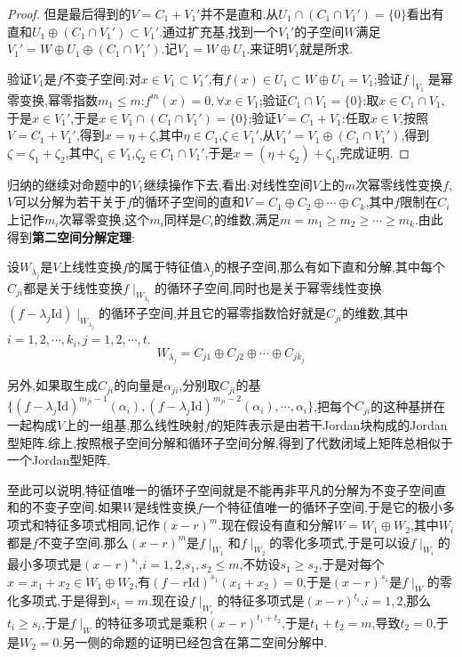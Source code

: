 \begin{proof}
	但是最后得到的$V=C_1+V_1'$并不是直和.从$U_1\cap(C_1\cap V_1')=\{0\}$看出有直和$U_1\oplus(C_1\cap V_1')\subset V_1'$.通过扩充基,找到一个$V_1'$的子空间$W$满足$V_1'=W\oplus U_1\oplus(C_1\cap V_1')$.记$V_1=W\oplus U_1$.来证明$V_1$就是所求.
	
	验证$V_1$是$f$不变子空间:对$x\in V_1\subset V_1'$,有$f(x)\in U_1\subset W\oplus U_1=V_1$;验证$f\mid_{V_1}$是幂零变换,幂零指数$m_1\le m$:$f^m(x)=0,\forall x\in V_1$;验证$C_1\cap V_1=\{0\}$:取$x\in C_1\cap V_1$,于是$x\in V_1'$,于是$x\in V_1\cap(C_1\cap V_1')=\{0\}$;验证$V=C_1+V_1$:任取$x\in V$,按照$V=C_1+V_1'$,得到$x=\eta+\zeta$,其中$\eta\in C_1$,$\zeta\in V_1'$,从$V_1'=V_1\oplus(C_1\cap V_1')$,得到$\zeta=\zeta_1+\zeta_2$,其中$\zeta_1\in V_1$,$\zeta_2\in C_1\cap V_1'$,于是$x=(\eta+\zeta_2)+\zeta_1$,完成证明.
	
\end{proof}

归纳的继续对命题中的$V_1$继续操作下去,看出:对线性空间$V$上的$m$次幂零线性变换$f$,$V$可以分解为若干关于$f$的循环子空间的直和$V=C_1\oplus C_2\oplus\cdots\oplus C_k$,其中$f$限制在$C_i$上记作$m_i$次幂零变换,这个$m_i$同样是$C_i$的维数,满足$m=m_1\ge m_2\ge\cdots\ge m_k$.由此得到\textbf{第二空间分解定理}:

设$W_{\lambda_j}$是$V$上线性变换$f$的属于特征值$\lambda_j$的根子空间,那么有如下直和分解,其中每个$C_{ji}$都是关于线性变换$f\mid_{W_{\lambda_j}}$的循环子空间,同时也是关于幂零线性变换$(f-\lambda_j\mathrm{Id})\mid_{W_{\lambda_j}}$的循环子空间,并且它的幂零指数恰好就是$C_{ji}$的维数,其中$i=1,2,\cdots,k_i,j=1,2,\cdots,t$.
$$W_{\lambda_j}=C_{j1}\oplus C_{j2}\oplus\cdots\oplus C_{jk_j}$$

另外,如果取生成$C_{ji}$的向量是$\alpha_{ji}$,分别取$C_{ji}$的基$\{(f-\lambda_j\mathrm{Id})^{m_{ji}-1}(\alpha_i),(f-\lambda_j\mathrm{Id})^{m_{ji}-2}(\alpha_i),\cdots,\alpha_i\}$,把每个$C_{ji}$的这种基拼在一起构成$V$上的一组基,那么线性映射$f$的矩阵表示是由若干Jordan块构成的Jordan型矩阵.综上,按照根子空间分解和循环子空间分解,得到了代数闭域上矩阵总相似于一个Jordan型矩阵.

至此可以说明,特征值唯一的循环子空间就是不能再非平凡的分解为不变子空间直和的不变子空间.如果$W$是线性变换$f$一个特征值唯一的循环子空间,于是它的极小多项式和特征多项式相同,记作$(x-r)^m$.现在假设有直和分解$W=W_1\oplus W_2$,其中$W_i$都是$f$不变子空间.那么$(x-r)^m$是$f\mid_{W_1}$和$f\mid_{W_2}$的零化多项式,于是可以设$f\mid_{W_i}$的最小多项式是$(x-r)^{s_i}$,$i=1,2$,$s_1,s_2\le m$,不妨设$s_1\ge s_2$,于是对每个$x=x_1+x_2\in W_1\oplus W_2$,有$(f-r\mathrm{Id})^{s_1}(x_1+x_2)=0$,于是$(x-r)^{s_1}$是$f\mid_{W}$的零化多项式,于是得到$s_1=m$.现在设$f\mid_{W_i}$的特征多项式是$(x-r)^{t_i}$,$i=1,2$,那么$t_i\ge s_i$,于是$f\mid_W$的特征多项式是乘积$(x-r)^{t_1+t_2}$,于是$t_1+t_2=m$,导致$t_2=0$,于是$W_2=0$.另一侧的命题的证明已经包含在第二空间分解中.

